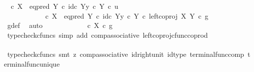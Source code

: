 \begin{isabellebody}
\ {\isachardoublequoteopen}{\isacharparenleft}{\kern0pt}{\isasymf}\ {\isasymcirc}\isactrlsub c\ {\isasymbeta}\isactrlbsub X\isactrlesub {\isacharparenright}{\kern0pt}\ {\isasymamalg}\ {\isacharparenleft}{\kern0pt}eq{\isacharunderscore}{\kern0pt}pred\ Y\ {\isasymcirc}\isactrlsub c\ {\isasymlangle}id\isactrlsub c\ Y{\isacharcomma}{\kern0pt}y\ {\isasymcirc}\isactrlsub c\ {\isasymbeta}\isactrlbsub Y\isactrlesub {\isasymrangle}{\isacharparenright}{\kern0pt}\ {\isasymcirc}\isactrlsub c\ u\isanewline
\ \ \ \ \ \ \ \ \ \ {\isacharequal}{\kern0pt}\ {\isacharparenleft}{\kern0pt}{\isasymf}\ {\isasymcirc}\isactrlsub c\ {\isasymbeta}\isactrlbsub X\isactrlesub {\isacharparenright}{\kern0pt}\ {\isasymamalg}\ {\isacharparenleft}{\kern0pt}eq{\isacharunderscore}{\kern0pt}pred\ Y\ {\isasymcirc}\isactrlsub c\ {\isasymlangle}id\isactrlsub c\ Y{\isacharcomma}{\kern0pt}y\ {\isasymcirc}\isactrlsub c\ {\isasymbeta}\isactrlbsub Y\isactrlesub {\isasymrangle}{\isacharparenright}{\kern0pt}\ {\isasymcirc}\isactrlsub c\ left{\isacharunderscore}{\kern0pt}coproj\ X\ Y\ {\isasymcirc}\isactrlsub c\ g{\isachardoublequoteclose}\isanewline
\ \ \ \ \ \ \ \ \isamarkupfalse%
\ g{\isacharunderscore}{\kern0pt}def\ \isamarkupfalse%
\ auto\isanewline
\ \ \ \ \ \ \isamarkupfalse%
\ \isamarkupfalse%
\ {\isachardoublequoteopen}{\isachardot}{\kern0pt}{\isachardot}{\kern0pt}{\isachardot}{\kern0pt}\ {\isacharequal}{\kern0pt}\ {\isacharparenleft}{\kern0pt}{\isasymf}\ {\isasymcirc}\isactrlsub c\ {\isasymbeta}\isactrlbsub X\isactrlesub {\isacharparenright}{\kern0pt}\ {\isasymcirc}\isactrlsub c\ g{\isachardoublequoteclose}\isanewline
\ \ \ \ \ \ \ \ \isamarkupfalse%
\ {\isacharparenleft}{\kern0pt}typecheck{\isacharunderscore}{\kern0pt}cfuncs{\isacharcomma}{\kern0pt}\ simp\ add{\isacharcolon}{\kern0pt}\ comp{\isacharunderscore}{\kern0pt}associative{}\ left{\isacharunderscore}{\kern0pt}coproj{\isacharunderscore}{\kern0pt}cfunc{\isacharunderscore}{\kern0pt}coprod{\isacharparenright}{\kern0pt}\isanewline
\ \ \ \ \ \ \isamarkupfalse%
\ \isamarkupfalse%
\ {\isachardoublequoteopen}{\isachardot}{\kern0pt}{\isachardot}{\kern0pt}{\isachardot}{\kern0pt}\ {\isacharequal}{\kern0pt}\ {\isasymf}{\isachardoublequoteclose}\isanewline
\ \ \ \ \ \ \ \ \isamarkupfalse%
\ {\isacharparenleft}{\kern0pt}typecheck{\isacharunderscore}{\kern0pt}cfuncs{\isacharcomma}{\kern0pt}\ smt\ {\isacharparenleft}{\kern0pt}z{}{\isacharparenright}{\kern0pt}\ comp{\isacharunderscore}{\kern0pt}associative{}\ id{\isacharunderscore}{\kern0pt}right{\isacharunderscore}{\kern0pt}unit{}\ id{\isacharunderscore}{\kern0pt}type\ terminal{\isacharunderscore}{\kern0pt}func{\isacharunderscore}{\kern0pt}comp\ terminal{\isacharunderscore}{\kern0pt}func{\isacharunderscore}{\kern0pt}unique{\isacharparenright}{\kern0pt}\isanewline

\end{isabellebody}
